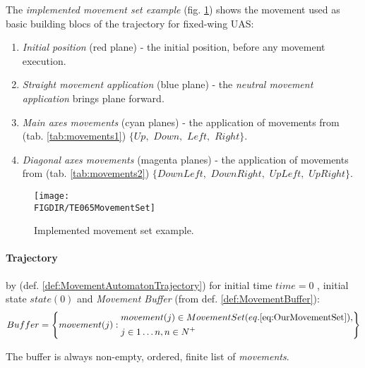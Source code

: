 The \emph{implemented movement set example} (fig. \ref{fig:implementedMovementSetExample}) shows the movement used as basic building blocs of the trajectory for fixed-wing UAS:
\begin{enumerate}
    \item \emph{Initial position} (red plane) - the initial position, before any movement execution.
    
    \item \emph{Straight movement application} (blue plane) - the \emph{neutral movement application} brings plane forward. 
    
    \item \emph{Main axes movements} (cyan planes) - the application of movements from (tab. \ref{tab:movements1}) $\{Up,$ $Down,$ $Left,$ $Right\}$.
    
    \item \emph{Diagonal axes movements} (magenta planes) - the application of movements from (tab. \ref{tab:movements2}) $\{Down Left,$ $Down Right,$  $Up Left,$   $Up Right\}$.
 \end{enumerate}
\begin{figure}[H]
    \centering
    \texttt{[image: \\FIGDIR/TE065MovementSet]}
    \caption{Implemented movement set example.}
    \label{fig:implementedMovementSetExample}
\end{figure}

\paragraph{Trajectory} by (def. \ref{def:MovementAutomatonTrajectory}) for initial time $time = 0$ , initial state $state(0)$ and \emph{Movement Buffer} (from def. \ref{def:MovementBuffer}):
\begin{equation}\label{eq:ourBuffer}
    Buffer = \left\{
                movement(j):
                \begin{aligned}
                    &movement(j)\in Movement Set (eq. \ref{eq:OurMovementSet}),\\
                    & j \in 1\dots n, n \in N^+
                \end{aligned}
            \right\}
\end{equation}

\begin{assumption}
    The buffer is always non-empty, ordered, finite list of \emph{movements}.
\end{assumption}

